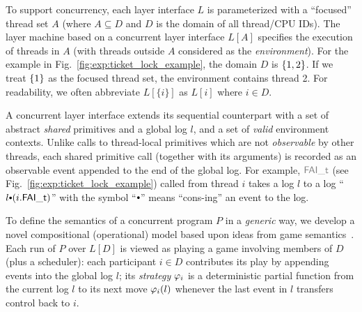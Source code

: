 To support concurrency, each layer interface $L$ is parameterized
with a ``focused'' thread set $A$ (where $A \subseteq D$ and $D$ is
the domain of all thread/CPU IDs).  The layer machine
based on a concurrent layer interface $L[A]$ specifies
the execution of threads in $A$ (with threads
outside $A$ considered as the {\em environment}). For the example in Fig.~\ref{fig:exp:ticket_lock_example}, the domain $D$ is $\{1, 2\}$. If we treat $\{1\}$ as the focused thread set, the environment contains thread 2.
For readability,
we often abbreviate $L[\{i\}]$ as $L[i]$ where $i\in{}D$.

A concurrent layer interface extends its sequential counterpart
 with a
set of abstract {\em shared} primitives and a global log $l$, and a set of {\em valid} environment contexts.
Unlike calls to thread-local primitives
which are not {\em observable} by other threads, each shared primitive call (together with its arguments) is recorded as an
observable event appended to the end of the global log. 
For example, $\commc{FAI\_t}$ (see Fig.~\ref{fig:exp:ticket_lock_example}) called from thread
$i$ takes a log $l$ to a log ``$l \cons (i.\incticket)$'' with the symbol
``$\cons$'' means ``cons-ing'' an event to the log. 

To define the semantics of a concurrent program $P$ in a {\em generic}
way, we develop a novel compositional (operational) model based upon
ideas from game semantics~\cite{gsinvite}. Each run of
$P$ over $L[D]$ is viewed as playing a game involving members of
$D$ (plus a scheduler): each participant $i\in{}D$ contributes its
play by appending events into the global log $l$; its {\em strategy}
$\varphi_{i}$ is a deterministic partial function from
the current log $l$ to its next move $\varphi_{i}(l)$ whenever
the last event in $l$ transfers control back to $i$.



